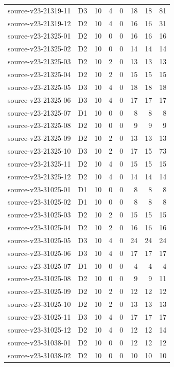 \begin{longtable}{p{}lrrrrrr}
source-v23-21319-11 & D3 & 10 & 4 & 0 & 18 & 18 & 81\\
source-v23-21319-12 & D2 & 10 & 4 & 0 & 16 & 16 & 31\\
source-v23-21325-01 & D2 & 10 & 0 & 0 & 16 & 16 & 16\\
source-v23-21325-02 & D2 & 10 & 0 & 0 & 14 & 14 & 14\\
source-v23-21325-03 & D2 & 10 & 2 & 0 & 13 & 13 & 13\\
source-v23-21325-04 & D2 & 10 & 2 & 0 & 15 & 15 & 15\\
source-v23-21325-05 & D3 & 10 & 4 & 0 & 18 & 18 & 18\\
source-v23-21325-06 & D3 & 10 & 4 & 0 & 17 & 17 & 17\\
source-v23-21325-07 & D1 & 10 & 0 & 0 & 8 & 8 & 8\\
source-v23-21325-08 & D2 & 10 & 0 & 0 & 9 & 9 & 9\\
source-v23-21325-09 & D2 & 10 & 2 & 0 & 13 & 13 & 13\\
source-v23-21325-10 & D3 & 10 & 2 & 0 & 17 & 15 & 73\\
source-v23-21325-11 & D2 & 10 & 4 & 0 & 15 & 15 & 15\\
source-v23-21325-12 & D2 & 10 & 4 & 0 & 14 & 14 & 14\\
source-v23-31025-01 & D1 & 10 & 0 & 0 & 8 & 8 & 8\\
source-v23-31025-02 & D1 & 10 & 0 & 0 & 8 & 8 & 8\\
source-v23-31025-03 & D2 & 10 & 2 & 0 & 15 & 15 & 15\\
source-v23-31025-04 & D2 & 10 & 2 & 0 & 16 & 16 & 16\\
source-v23-31025-05 & D3 & 10 & 4 & 0 & 24 & 24 & 24\\
source-v23-31025-06 & D3 & 10 & 4 & 0 & 17 & 17 & 17\\
source-v23-31025-07 & D1 & 10 & 0 & 0 & 4 & 4 & 4\\
source-v23-31025-08 & D2 & 10 & 0 & 0 & 9 & 9 & 11\\
source-v23-31025-09 & D2 & 10 & 2 & 0 & 12 & 12 & 12\\
source-v23-31025-10 & D2 & 10 & 2 & 0 & 13 & 13 & 13\\
source-v23-31025-11 & D3 & 10 & 4 & 0 & 17 & 17 & 17\\
source-v23-31025-12 & D2 & 10 & 4 & 0 & 12 & 12 & 14\\
source-v23-31038-01 & D2 & 10 & 0 & 0 & 12 & 12 & 12\\
source-v23-31038-02 & D2 & 10 & 0 & 0 & 10 & 10 & 10\\

\end{longtable}
